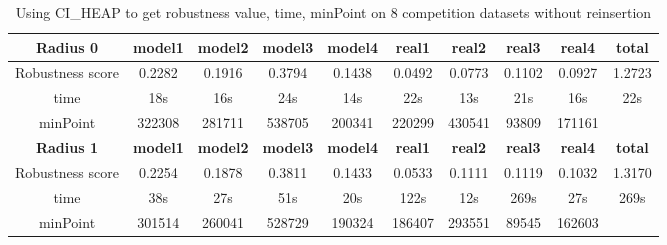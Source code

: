 \documentclass{article}
\begin{document}
	
	\begin{table}[!htbp]
		\begin{adjustwidth}{-1cm}{}		
			\begin{threeparttable}		
				\centering
				\caption{Using CI\_HEAP to get robustness value, time, minPoint on 8 competition datasets without reinsertion}
				\label{tab:table9}
				\begin{tabular}{|c|c|c|c|c|c|c|c|c|c|}
					\hline
					\textbf{Radius 0} & \textbf{model1} & \textbf{model2} & \textbf{model3} & \textbf{model4} & \textbf{real1} & \textbf{real2} & \textbf{real3} & \textbf{real4} & \textbf{total} \\ \hline
					Robustness score                 & 0.2282          & 0.1916          & 0.3794          & 0.1438          & 0.0492         & 0.0773         & 0.1102         & 0.0927         & 1.2723         \\ \hline
					time                             & 18s             & 16s             & 24s             & 14s             & 22s            & 13s            & 21s            & 16s            & 22s            \\ \hline
					minPoint                         & 322308          & 281711          & 538705          & 200341          & 220299         & 430541         & 93809          & 171161         &                \\ \hline
					
					\textbf{Radius 1} & \textbf{model1} & \textbf{model2} & \textbf{model3} & \textbf{model4} & \textbf{real1} & \textbf{real2} & \textbf{real3} & \textbf{real4} & \textbf{total} \\ \hline
					Robustness score                 & 0.2254          & 0.1878          & 0.3811          & 0.1433          & 0.0533         & 0.1111         & 0.1119         & 0.1032         & 1.3170         \\ \hline
					time                             & 38s             & 27s             & 51s             & 20s             & 122s           & 12s            & 269s           & 27s            & 269s           \\ \hline
					minPoint                         & 301514          & 260041          & 528729          & 190324          & 186407         & 293551         & 89545          & 162603         &                \\ \hline
					

\end{tabular}
\end{threeparttable}
\end{adjustwidth}
\end{table}
\end{document}
